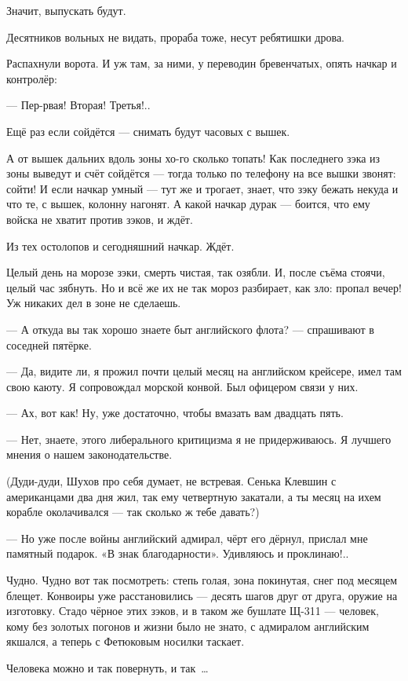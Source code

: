 Значит, выпускать будут.

Десятников вольных не видать, прораба тоже, несут ребятишки дрова.

Распахнули ворота. И уж там, за ними, у переводин бревенчатых, опять начкар и контролёр:

--- Пер-рвая! Вторая! Третья!..

Ещё раз если сойдётся --- снимать будут часовых с вышек.

А от вышек дальних вдоль зоны хо-го сколько топать! Как последнего зэка из зоны выведут и счёт сойдётся --- тогда только по телефону на все вышки звонят: сойти! И если начкар умный --- тут же и трогает, знает, что зэку бежать некуда и что те, с вышек, колонну нагонят. А какой начкар дурак --- боится, что ему войска не хватит против зэков, и ждёт.

Из тех остолопов и сегодняшний начкар. Ждёт.

Целый день на морозе зэки, смерть чистая, так озябли. И, после съёма стоячи, целый час зябнуть. Но и всё же их не так мороз разбирает, как зло: пропал вечер! Уж никаких дел в зоне не сделаешь.

--- А откуда вы так хорошо знаете быт английского флота? --- спрашивают в соседней пятёрке.

--- Да, видите ли, я прожил почти целый месяц на английском крейсере, имел там свою каюту. Я сопровождал морской конвой. Был офицером связи у них.

--- Ах, вот как! Ну, уже достаточно, чтобы вмазать вам двадцать пять.

--- Нет, знаете, этого либерального критицизма я не придерживаюсь. Я лучшего мнения о нашем законодательстве.

(Дуди-дуди, Шухов про себя думает, не встревая. Сенька Клевшин с американцами два дня жил, так ему четвертную закатали, а ты месяц на ихем корабле околачивался --- так сколько ж тебе давать?)

--- Но уже после войны английский адмирал, чёрт его дёрнул, прислал мне памятный подарок. «В знак благодарности». Удивляюсь и проклинаю!..

Чудно. Чудно вот так посмотреть: степь голая, зона покинутая, снег под месяцем блещет. Конвоиры уже расстановились --- десять шагов друг от друга, оружие на изготовку. Стадо чёрное этих зэков, и в таком же бушлате Щ-311 --- человек, кому без золотых погонов и жизни было не знато, с адмиралом английским якшался, а теперь с Фетюковым носилки таскает.

Человека можно и так повернуть, и так~\dots{}

